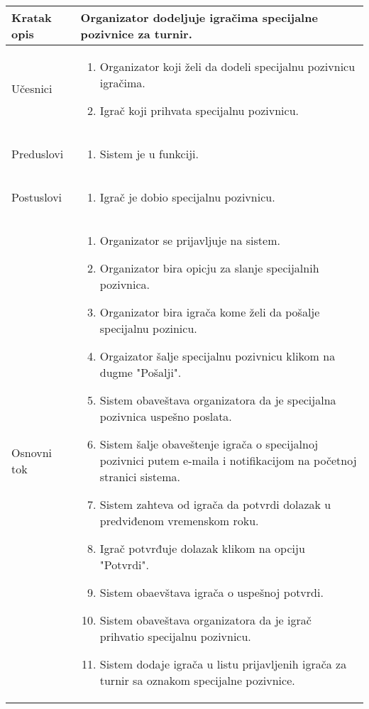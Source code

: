 \documentclass{article}
\begin{document}
\begin{longtable}{| p{} | p{} |} 
\hline
    Kratak opis & Organizator dodeljuje igračima specijalne pozivnice za turnir.\\ 
\hline    
    Učesnici & \begin{enumerate}
        \item Organizator koji želi da dodeli specijalnu pozivnicu igračima.
        \item Igrač koji prihvata specijalnu pozivnicu.
    \end{enumerate}
    \\
\hline
   Preduslovi & \begin{enumerate}
       \item Sistem je u funkciji.
   \end{enumerate}\\
\hline  
    Postuslovi & \begin{enumerate}
        \item Igrač je dobio specijalnu pozivnicu.
    \end{enumerate}\\
\hline
    Osnovni tok & \begin{enumerate}
        \item Organizator se prijavljuje na sistem.
        \item Organizator bira opicju za slanje specijalnih pozivnica.
        \item Organizator bira igrača kome želi da pošalje specijalnu pozinicu.
        \item Orgaizator šalje specijalnu pozivnicu klikom na dugme "Pošalji".
        \item Sistem obaveštava organizatora da je specijalna pozivnica uspešno poslata.
        \item Sistem šalje obaveštenje igrača o specijalnoj pozivnici putem e-maila i notifikacijom na početnoj stranici sistema.
        \item Sistem zahteva od igrača da potvrdi dolazak u predviđenom vremenskom roku.
        \item Igrač potvrđuje dolazak klikom na opciju "Potvrdi".
        \item Sistem obaevštava igrača o uspešnoj potvrdi.
        \item Sistem obaveštava organizatora da je igrač prihvatio specijalnu pozivnicu.
        \item Sistem dodaje igrača u listu prijavljenih igrača za turnir sa oznakom specijalne pozivnice.
        

\end{enumerate}
\end{longtable}
\end{document}
